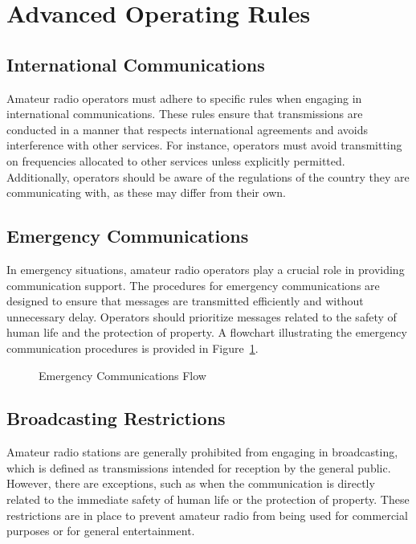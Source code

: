 \section{Advanced Operating Rules}
\label{sec:advanced_rules}

\subsection*{International Communications}
Amateur radio operators must adhere to specific rules when engaging in international communications. These rules ensure that transmissions are conducted in a manner that respects international agreements and avoids interference with other services. For instance, operators must avoid transmitting on frequencies allocated to other services unless explicitly permitted. Additionally, operators should be aware of the regulations of the country they are communicating with, as these may differ from their own.

\subsection*{Emergency Communications}
In emergency situations, amateur radio operators play a crucial role in providing communication support. The procedures for emergency communications are designed to ensure that messages are transmitted efficiently and without unnecessary delay. Operators should prioritize messages related to the safety of human life and the protection of property. A flowchart illustrating the emergency communication procedures is provided in Figure~\ref{fig:emergency_comms}.

\begin{figure}[h!]
    \centering
    \caption{Emergency Communications Flow}
    \label{fig:emergency_comms}
\end{figure}

\subsection*{Broadcasting Restrictions}
Amateur radio stations are generally prohibited from engaging in broadcasting, which is defined as transmissions intended for reception by the general public. However, there are exceptions, such as when the communication is directly related to the immediate safety of human life or the protection of property. These restrictions are in place to prevent amateur radio from being used for commercial purposes or for general entertainment.

